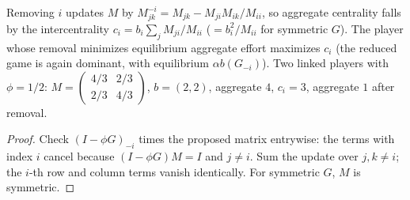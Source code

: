 \begin{theorem}
\label{thm:net-key}
\leanok
{}
Removing $i$ updates $M$ by $M^{-i}_{jk}=M_{jk}-M_{ji}M_{ik}/M_{ii}$, so aggregate centrality falls by the
intercentrality $c_i=b_i\sum_jM_{ji}/M_{ii}$ ($=b_i^2/M_{ii}$ for symmetric $G$). The player whose removal minimizes
equilibrium aggregate effort maximizes $c_i$ (the reduced game is again dominant, with equilibrium $\alpha b(G_{-i})$).
Two linked players with $\phi=1/2$: $M=\begin{pmatrix}4/3&2/3\\2/3&4/3\end{pmatrix}$, $b=(2,2)$, aggregate $4$,
$c_i=3$, aggregate $1$ after removal.
\end{theorem}
\begin{proof}
\leanok
Check $(I-\phi G)_{-i}$ times the proposed matrix entrywise: the terms with index $i$ cancel because
$(I-\phi G)M=I$ and $j\ne i$. Sum the update over $j,k\ne i$; the $i$-th row and column terms vanish identically.
For symmetric $G$, $M$ is symmetric.
\end{proof}
